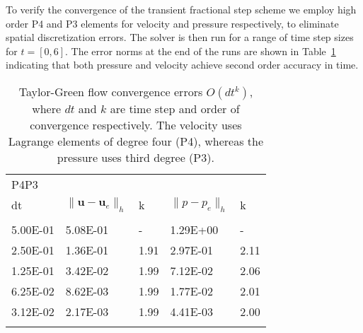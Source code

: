\documentclass[final,3p,times,twocolumn]{elsarticle}
\begin{document}
To verify the convergence of the transient fractional step scheme we employ high order P4 and P3 elements for velocity and pressure respectively, to eliminate spatial discretization errors. The solver is then run for a range of time step sizes for $t=[0, 6]$. The error norms at the end of the runs are shown in Table~\ref{tab:orderP4P3} indicating that both pressure and velocity achieve second order accuracy in time.
\begin{table}[t!]
\caption{Taylor-Green flow convergence errors $O(dt^k)$, where $dt$ and $k$ are time step and order of convergence respectively. The velocity uses Lagrange elements of degree four (P4), whereas the pressure uses third degree (P3).}
\label{tab:orderP4P3}
\begin{tabular}{p{4em} p{4em} p{2em} p{4em} p{2em}}
    \\
   P4P3 \\
\rule{0pt}{3ex}
   dt & ${\| \bm{u} -\bm{u}_e\|_h} $ & k & ${\| p-p_e \|_h} $  & k  \\
   \hline \\
   5.00E-01 &   5.08E-01 & -  &   1.29E+00 & - \\
   2.50E-01 &   1.36E-01 & 1.91  &   2.97E-01 & 2.11 \\
   1.25E-01 &   3.42E-02 & 1.99  &   7.12E-02 & 2.06 \\
   6.25E-02 &   8.62E-03 & 1.99  &   1.77E-02 & 2.01 \\
   3.12E-02 &   2.17E-03 & 1.99  &   4.41E-03 & 2.00 \\
  \hline \\
\end{tabular}
\end{table}
\end{document}
